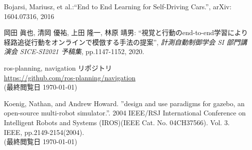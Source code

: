 \documentclass[10pt]{ujarticle}
\begin{document}
    \vspace{5truemm}
    {\footnotesize
        \begin{thebibliography}{99}

            Bojarsi, Mariusz, et al.:``End to End Learning for Self-Driving Cars.'', arXiv: 1604.07316, 2016
            
            岡田 眞也, 清岡 優祐, 上田 隆一, 林原 靖男: ``視覚と行動のend-to-end学習により経路追従行動をオンラインで模倣する手法の提案'', \textit{計測自動制御学会 SI 部門講演会 SICE-SI2021 予稿集}, pp.1147-1152, 2020.



            ros-planning, navigation リポジトリ\\
            \url{https://github.com/ros-planning/navigation}\\
            (最終閲覧日 \today)


            Koenig, Nathan, and Andrew Howard. ”design and use paradigms for gazebo, an open-source multi-robot simulator.”. 2004 IEEE/RSJ International Conference on Intelligent Robots and Systems (IROS)(IEEE Cat. No. 04CH37566). Vol. 3. IEEE, pp.2149-2154(2004).\\
            (最終閲覧日 \today)

            
        \end{thebibliography}
    }
\end{document}
